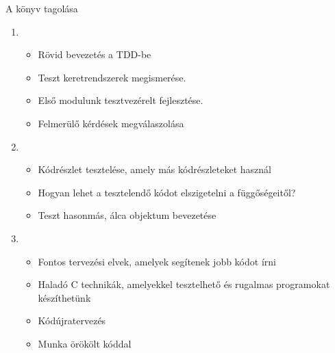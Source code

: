 \begin{frame}{A könyv tagolása}
  \begin{enumerate}[<+->]
  \item
    \begin{itemize}
    \item Rövid bevezetés a TDD-be
    \item Teszt keretrendszerek megismerése.
    \item Első modulunk tesztvezérelt fejlesztése.
    \item Felmerülő kérdések megválaszolása
    \end{itemize}

  \item
    \begin{itemize}
    \item Kódrészlet tesztelése, amely más kódrészleteket használ
    \item Hogyan lehet a tesztelendő kódot elszigetelni a függőségeitől?
    \item Teszt hasonmás, álca objektum bevezetése
    \end{itemize}

  \item
    \begin{itemize}
    \item Fontos tervezési elvek, amelyek segítenek jobb kódot írni
    \item Haladó C technikák, amelyekkel tesztelhető és rugalmas programokat készíthetünk
    \item Kódújratervezés
    \item Munka örökölt kóddal
    \end{itemize}
  \end{enumerate}
\end{frame}
